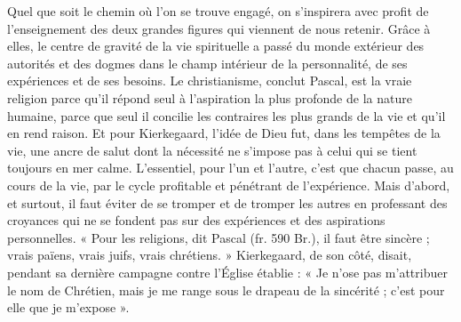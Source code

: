\documentclass[12pt,a4paper]{article}
\newcommand{\opage}[1]{\marginnote{\footnotesize\textit{[#1]}}}
\begin{document}
Quel que soit le chemin où l'on se trouve engagé, on s'inspirera
avec profit de l'enseignement des deux grandes figures qui viennent
de nous retenir. Grâce à elles, le centre de gravité de la vie spirituelle
a passé du monde extérieur des autorités et des dogmes dans
le champ intérieur de la personnalité, de ses expériences et de ses
besoins. Le christianisme, conclut Pascal, est la vraie religion
\opage{245} parce qu'il répond seul à l'aspiration la plus profonde de la nature
humaine, parce que seul il concilie les contraires les plus grands de
la vie et qu'il en rend raison. Et pour Kierkegaard, l'idée de Dieu
fut, dans les tempêtes de la vie, une ancre de salut dont la nécessité
ne s'impose pas à celui qui se tient toujours en mer calme. L'essentiel,
pour l'un et l'autre, c'est que chacun passe, au cours de la
vie, par le cycle profitable et pénétrant de l'expérience. Mais d'abord,
et surtout, il faut éviter de se tromper et de tromper les autres en
professant des croyances qui ne se fondent pas sur des expériences
et des aspirations personnelles. « Pour les religions, dit Pascal
(fr. 590 Br.), il faut être sincère ; vrais païens, vrais juifs, vrais
chrétiens. » Kierkegaard, de son côté, disait, pendant sa dernière
campagne contre l'Église établie : « Je n'ose pas m'attribuer le nom
de Chrétien, mais je me range sous le drapeau de la sincérité ; c'est
pour elle que je m'expose ».
\end{document}
